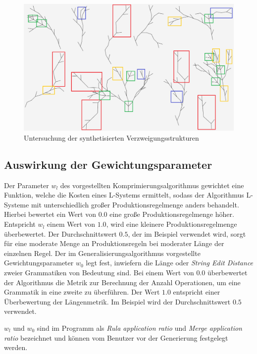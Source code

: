 \begin{figure}[H]
    \centering
    \includegraphics[width=14.5cm]{../images/synthesis_marks.png}
    \caption{Untersuchung der synthetisierten Verzweigungsstrukturen}
\end{figure}


\subsection*{Auswirkung der Gewichtungsparameter}
Der Parameter $w_l$ des vorgestellten Komprimierungsalgorithmus gewichtet eine Funktion,
welche die Kosten eines L-Systems ermittelt, sodass der Algorithmus L-Systeme mit unterschiedlich
großer Produktionsregelmenge anders behandelt.
Hierbei bewertet ein Wert von $0.0$ eine große Produktionsregelmenge höher.
Entspricht $w_l$ einem Wert von $1.0$, wird eine kleinere Produktionsregelmenge überbewertet.
Der Durchschnittswert $0.5$, der im Beispiel verwendet wird, sorgt für eine moderate Menge an
Produktionsregeln bei moderater Länge der einzelnen Regel.
Der im Generalisierungsalgorithmus vorgestellte Gewichtungsparameter $w_0$ legt fest, inwiefern
die Länge oder \textit{String Edit Distance} zweier Grammatiken von Bedeutung sind.
Bei einem Wert von $0.0$ überbewertet der Algorithmus die Metrik zur Berechnung der Anzahl Operationen,
um eine Grammatik in eine zweite zu überführen.
Der Wert $1.0$ entspricht einer Überbewertung der Längenmetrik.
Im Beispiel wird der Durchschnittswert $0.5$ verwendet.

$w_l$ und $w_0$ sind im Programm als \textit{Rula application ratio} und \textit{Merge application ratio}
bezeichnet und können vom Benutzer vor der Generierung festgelegt werden.

